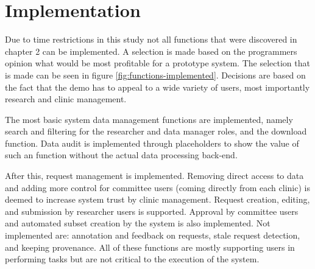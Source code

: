 \section{Implementation}


Due to time restrictions in this study not all functions that were discovered in chapter 2 can be implemented.
A selection is made based on the programmers opinion what would be most profitable for a prototype system.
The selection that is made can be seen in figure \ref{fig:functions-implemented}.
Decisions are based on the fact that the demo has to appeal to a wide variety of users, most importantly research and clinic management.

The most basic system data management functions are implemented, namely 
search and filtering for the researcher and data manager roles, and the download function.
Data audit is implemented through placeholders to show the value of such an function without the actual data processing back-end. 

After this, request management is implemented.
Removing direct access to data and adding more control for committee users (coming directly from each clinic) is deemed to increase system trust by clinic management.
Request creation, editing, and submission by researcher users is supported.
Approval by committee users and automated subset creation by the system is also implemented.
Not implemented are: annotation and feedback on requests, stale request detection, and keeping provenance.
All of these functions are mostly supporting users in performing tasks but are not critical to the execution of the system.

